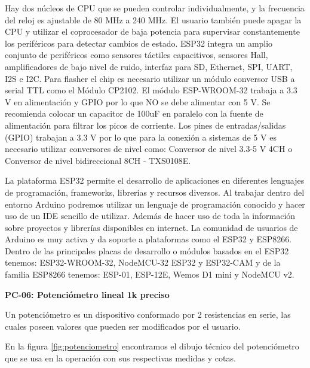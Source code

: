     Hay dos núcleos de CPU que se pueden controlar individualmente, y la frecuencia del reloj es ajustable de 80 MHz a 240 MHz. El usuario también puede apagar la CPU y utilizar el coprocesador de baja potencia para supervisar constantemente los periféricos para detectar cambios de estado. ESP32 integra un amplio conjunto de periféricos como sensores táctiles capacitivos, sensores Hall, amplificadores de bajo nivel de ruido, interfaz para SD, Ethernet, SPI, UART, I2S e I2C. Para flasher el chip es necesario utilizar un módulo conversor USB a serial TTL como el Módulo CP2102.
    El módulo ESP-WROOM-32 trabaja a 3.3 V en alimentación y GPIO por lo que NO se debe alimentar con 5 V. Se recomienda colocar un capacitor de 100uF en paralelo con la fuente de alimentación para filtrar los picos de corriente. Los pines de entradas/salidas (GPIO) trabajan a 3.3 V por lo que para la conexión a sistemas de 5 V es necesario utilizar conversores de nivel como: Conversor de nivel 3.3-5 V 4CH o Conversor de nivel bidireccional 8CH - TXS0108E.
    
    
    La plataforma ESP32 permite el desarrollo de aplicaciones en diferentes lenguajes de programación, frameworks, librerías y recursos diversos. Al trabajar dentro del entorno Arduino podremos utilizar un lenguaje de programación conocido y hacer uso de un IDE sencillo de utilizar. Además de hacer uso de toda la información sobre proyectos y librerías disponibles en internet. La comunidad de usuarios de Arduino es muy activa y da soporte a plataformas como el ESP32 y ESP8266. Dentro de las principales placas de desarrollo o módulos basados en el ESP32 tenemos: ESP32-WROOM-32, NodeMCU-32 ESP32 y ESP32-CAM y de la familia ESP8266 tenemos: ESP-01, ESP-12E, Wemos D1 mini y NodeMCU v2.\cite{naylamp}
    
    
    
    \textbf{PC-06: Potenciómetro lineal 1k preciso }
    
    Un potenciómetro es un dispositivo conformado por 2 resistencias en serie, las cuales poseen valores que pueden ser modificados por el usuario. 
    
    En la figura \ref{fig:potenciometro} encontramos el dibujo técnico del potenciómetro que se usa en la operación con sus respectivas medidas y cotas.
    
